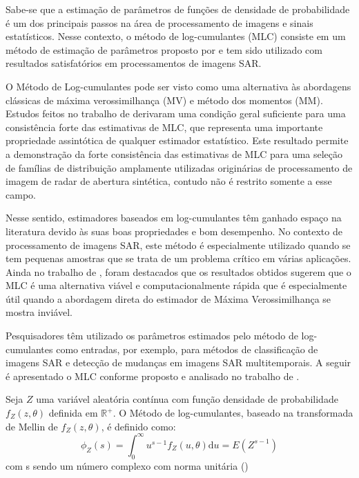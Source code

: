 \documentclass[12pt]{article}
\begin{document}
Sabe-se que a estimação de parâmetros de funções de densidade de probabilidade é um dos principais passos na área de processamento de imagens e sinais estatísticos. Nesse contexto, o método de log-cumulantes (MLC) consiste em um método de estimação de parâmetros proposto por \citet{nicolas2002} e tem sido utilizado com resultados satisfatórios em processamentos de imagens SAR.

O Método de Log-cumulantes pode ser visto como uma alternativa às abordagens clássicas de máxima verossimilhança (MV) e método dos momentos (MM). Estudos feitos no trabalho de \citet{krylov2013} derivaram uma condição geral suficiente para uma consistência forte das estimativas de MLC, que representa uma importante propriedade assintótica de qualquer estimador estatístico. Este resultado permite a demonstração da forte consistência das estimativas de MLC para uma seleção de famílias de distribuição amplamente utilizadas originárias de processamento de imagem de radar de abertura sintética, contudo não é restrito somente a esse campo. 

Nesse sentido, estimadores baseados em log-cumulantes têm ganhado espaço na literatura devido às suas boas propriedades e bom desempenho. No contexto de processamento de imagens SAR, este método é especialmente utilizado quando se tem pequenas amostras que se trata de um problema crítico em várias aplicações. Ainda no trabalho de \citet{krylov2013}, foram destacados que os resultados obtidos sugerem que o MLC é uma alternativa viável e computacionalmente rápida que é especialmente útil quando a abordagem direta do estimador de Máxima Verossimilhança se mostra inviável. 

Pesquisadores têm utilizado os parâmetros estimados pelo método de log-cumulantes como entradas, por exemplo, para métodos de classificação de imagens SAR e detecção de mudanças em imagens SAR multitemporais. A seguir é apresentado o MLC conforme proposto e analisado no trabalho de \citet{nicolas2002}.

Seja $Z$ uma variável aleatória contínua com função densidade de probabilidade $f_Z(z, \theta)$ definida em $\mathbb{R}^{+}$. O Método de log-cumulantes, baseado na transformada de Mellin de $f_Z(z, \theta)$, é definido como:
\begin{equation}
    \phi_{Z}(s) = \int_{0}^{\infty} u^{s-1} f_{Z}(u, \theta)\mathrm{d}u = E(Z^{s-1}) \label{eq:logcum}
\end{equation}
com s sendo um número complexo com norma unitária (\citet{nicolas2002})
\end{document}
